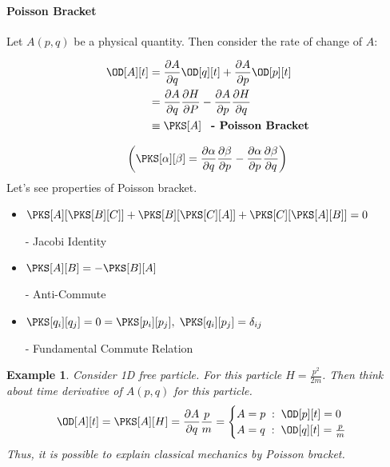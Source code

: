 \documentclass[final]{IEEEphot}
\newtheorem{example}{Example}[section]
\newcommand{\PD}[2]{\dfrac{\partial #1}{\partial #2}} %
\newcommand{\BKS}[1]{\left( #1 \right)} %
\newcommand{\HS}{\hspace{0.3cm}} %
\newcommand{\VS}{\vspace{0.3cm}} %
\newcommand{\Com}{,\hspace{0.1cm}} %
\newcommand{\hs}{\hspace{0.1cm}} %
\newcommand\textline[4][t]{%
  \par\smallskip\noindent\parbox[#1]{.6\textwidth}{\raggedright\textnormal{#2}}%
  \parbox[#1]{.1\textwidth}{\centering#3}%
  \parbox[#1]{.35\textwidth}{\raggedleft\textnormal{#4}}\par\smallskip%
}%
\begin{document}
\newpage

\paragraph{Poisson Bracket}
\VS

Let $A(p,q)$ be a physical quantity. Then consider the rate of change of $A$:

\begin{gather}
 \begin{split}
  \OD[A][t] &= \PD{A}{q} \OD[q][t] + \PD{A}{p} \OD[p][t] \\
            &= \PD{A}{q} \PD{H}{P} - \PD{A}{p} \PD{H}{q} \\
            & \equiv \PKS[A] \HS \textbf{- Poisson Bracket}
 \end{split}
\end{gather}

\begin{equation*}
 \BKS{\PKS[\alpha][\beta] = \PD{\alpha}{q} \PD{\beta}{p} - \PD{\alpha}{p} \PD{\beta}{q}}
\end{equation*}
\VS
Let's see properties of Poisson bracket.

\begin{itemize}
 \item \textline[t]{$\PKS[A][{\PKS[B][C]}] + \PKS[B][{\PKS[C][A]}] + \PKS[C][{\PKS[A][B]}] = 0$}{}{- Jacobi Identity}
 \item \textline[t]{$\PKS[A][B] = - \PKS[B][A]$}{}{- Anti-Commute}
 \item \textline[t]{$\PKS[q_i][q_j] = 0 = \PKS[p_i][p_j]\Com\PKS[q_i][p_j] = \delta_{ij}$}{}{- Fundamental Commute Relation} 
\end{itemize}

\VS

\begin{example}
 \normalfont
 Consider 1D free particle. For this particle $H =\frac{p^2}{2m}$. Then think about time derivative of $A(p,q)$ for this particle.
 \begin{equation}
  \OD[A][t] = \PKS[A][H] = \PD{A}{q} \frac{p}{m} =
  \begin{cases}
   A = p \hs : \hs \OD[p][t] = 0 \\
   A = q \hs : \hs \OD[q][t] = \frac{p}{m}
  \end{cases}
 \end{equation}
 Thus, it is possible to explain classical mechanics by Poisson bracket.
\end{example}

\VS
\end{document}

